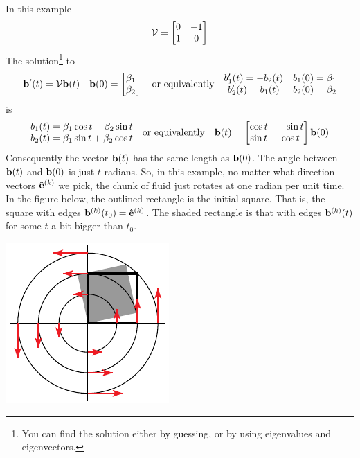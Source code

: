 \begin{eg}[$\vv(x,y)= -y\hi+x\hj$]\label{eg:flowRot}
In this example
\begin{equation*}
\mathcal{V}=\left[\begin{matrix}0&-1\cr 1&0\end{matrix}\right]
\end{equation*}
The solution\footnote{You can find the solution either by guessing, or by using eigenvalues and eigenvectors.} to 
\begin{equation*}
\mathbf{b}'(t)=\mathcal{V}\mathbf{b}(t)\quad 
\mathbf{b}(0)=\left[\begin{matrix}\beta_1 \\ \beta_2\end{matrix}\right]
\quad\text{or equivalently}\quad
\begin{matrix}b_1'(t)=-b_2(t) & b_1(0)=\beta_1\cr
        b_2'(t)=b_1(t) & b_2(0)=\beta_2\end{matrix}
\end{equation*}
is
\begin{equation*}
\begin{matrix}b_1(t)=\beta_1\cos t-\beta_2\sin t\cr
        b_2(t)=\beta_1\sin t+\beta_2\cos t\end{matrix}
\quad\text{or equivalently}\quad
\mathbf{b}(t)=\left[\begin{matrix}\cos t&-\sin t\cr \sin t&
                             \cos t\end{matrix}\right]\mathbf{b}(0)
\end{equation*}
Consequently the vector $\mathbf{b}(t)$ has the same length as $\mathbf{b}(0)$. 
The angle between $\mathbf{b}(t)$ and $\mathbf{b}(0)$ is just $t$ radians. So, 
in this example, no matter
what direction vectors $\mathbf{\hat e}^{(k)}$ we pick, the chunk of fluid just 
rotates at one radian
per unit time. In the figure below, the outlined
rectangle is the initial square. That is, the square with edges $\mathbf{b}^{(k)}(t_0)=\mathbf{\hat e}^{(k)}$.
The shaded rectangle is that with edges $\mathbf{b}^{(k)}(t)$ for some $t$ a bit
bigger than $t_0$.

\begin{nfig}
\begin{center}
    \includegraphics{square2.pdf}
\end{center}
\end{nfig}


\end{eg}


